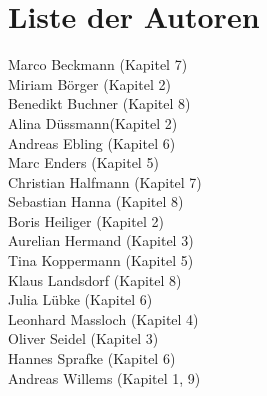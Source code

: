\chapter*{Liste der Autoren}
Marco Beckmann (Kapitel 7)\\
Miriam Börger (Kapitel 2)\\
Benedikt Buchner (Kapitel 8)\\
Alina Düssmann(Kapitel 2)\\
Andreas Ebling (Kapitel 6)\\
Marc Enders (Kapitel 5)\\
Christian Halfmann (Kapitel 7)\\
Sebastian Hanna (Kapitel 8)\\
Boris Heiliger (Kapitel 2)\\
Aurelian Hermand (Kapitel 3)\\
Tina Koppermann (Kapitel 5)\\
Klaus Landsdorf (Kapitel 8)\\
Julia Lübke (Kapitel 6)\\
Leonhard Massloch (Kapitel 4)\\
Oliver Seidel (Kapitel 3)\\
Hannes Sprafke (Kapitel 6)\\
Andreas Willems (Kapitel 1, 9)
